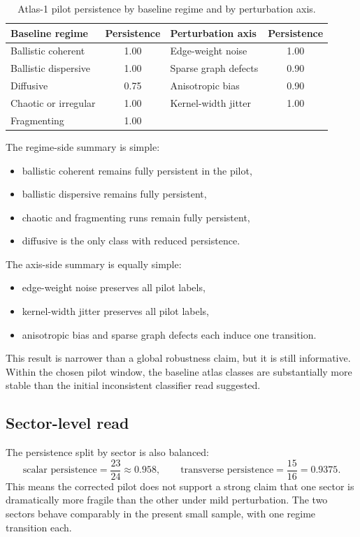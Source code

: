 \documentclass[11pt]{article}
\begin{document}
\begin{table}[t]
\centering
\begin{tabular}{lc|lc}
\hline
Baseline regime & Persistence & Perturbation axis & Persistence \\
\hline
Ballistic coherent & 1.00 & Edge-weight noise & 1.00 \\
Ballistic dispersive & 1.00 & Sparse graph defects & 0.90 \\
Diffusive & 0.75 & Anisotropic bias & 0.90 \\
Chaotic or irregular & 1.00 & Kernel-width jitter & 1.00 \\
Fragmenting & 1.00 & & \\
\hline
\end{tabular}
\caption{Atlas-1 pilot persistence by baseline regime and by perturbation axis.}
\label{tab:persistence-summary}
\end{table}

The regime-side summary is simple:
\begin{itemize}
\item ballistic coherent remains fully persistent in the pilot,
\item ballistic dispersive remains fully persistent,
\item chaotic and fragmenting runs remain fully persistent,
\item diffusive is the only class with reduced persistence.
\end{itemize}

The axis-side summary is equally simple:
\begin{itemize}
\item edge-weight noise preserves all pilot labels,
\item kernel-width jitter preserves all pilot labels,
\item anisotropic bias and sparse graph defects each induce one transition.
\end{itemize}

This result is narrower than a global robustness claim, but it is still informative. Within the chosen pilot window, the baseline atlas classes are substantially more stable than the initial inconsistent classifier read suggested.

\subsection{Sector-level read}
The persistence split by sector is also balanced:
\begin{equation}
\text{scalar persistence} = \frac{23}{24} \approx 0.958,
\qquad
\text{transverse persistence} = \frac{15}{16} = 0.9375.
\end{equation}
This means the corrected pilot does not support a strong claim that one sector is dramatically more fragile than the other under mild perturbation. The two sectors behave comparably in the present small sample, with one regime transition each.
\end{document}
